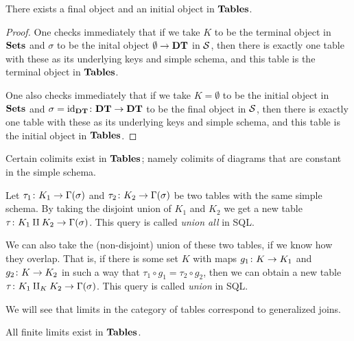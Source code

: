 \documentclass{amsart}
\begin{document}
\begin{lemma}\label{final object}

There exists a final object and an initial object in ${\bf Tables}$.    

\end{lemma}

\begin{proof}

One checks immediately that if we take $K$ to be the terminal object in ${\bf Sets}$ and $\sigma$ to be the inital object $\emptyset\rightarrow{\bf DT}$ in $\mathcal{S}$, then there is exactly one table with these as its underlying keys and simple schema, and this table is the terminal object in ${\bf Tables}$.

One also checks immediately that if we take $K=\emptyset$ to be the initial object in ${\bf Sets}$ and $\sigma=\textnormal{id}_{{\bf DT}}\colon{\bf DT}\rightarrow{\bf DT}$ to be the final object in $\mathcal{S}$, then there is exactly one table with these as its underlying keys and simple schema, and this table is the initial object in ${\bf Tables}$.

\end{proof}

Certain colimits exist in ${\bf Tables}$; namely colimits of diagrams that are constant in the simple schema.

\begin{construction}

Let $\tau_1\colon K_1\rightarrow\Gamma(\sigma)$ and $\tau_2\colon K_2\rightarrow\Gamma(\sigma)$ be two tables with the same simple schema.  By taking the disjoint union of $K_1$ and $K_2$ we get a new table $\tau\colon K_1\amalg K_2\rightarrow\Gamma(\sigma)$.  This query is called {\em union all} in SQL.  

We can also take the (non-disjoint) union of these two tables, if we know how they overlap.  That is, if there is some set $K$ with maps $g_1\colon K\rightarrow K_1$ and $g_2\colon K\rightarrow K_2$ in such a way that $\tau_1\circ g_1=\tau_2\circ g_2$, then we can obtain a new table $\tau\colon K_1\amalg_KK_2\rightarrow\Gamma(\sigma)$.  This query is called {\em union} in SQL.

\end{construction}

We will see that limits in the category of tables correspond to generalized joins.

\begin{proposition}\label{finite limits exist}

All finite limits exist in ${\bf Tables}$.

\end{proposition}
\end{document}
